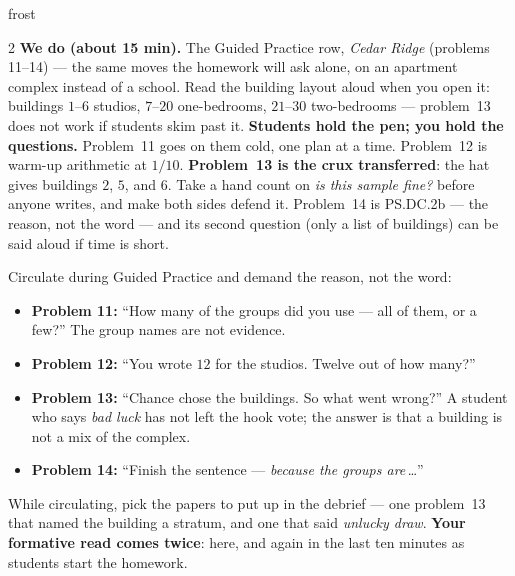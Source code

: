 \documentclass[10pt]{article}
\begin{document}
\begin{skillbox}{frost}
\begin{multicols}{2}
\columnbreak
\textbf{We do (about 15 min).} The Guided Practice row, \emph{Cedar Ridge} (problems 11--14)
--- the same moves the homework will ask alone, on an apartment complex instead of a school.
Read the building layout aloud when you open it: buildings $1$--$6$ studios, $7$--$20$
one-bedrooms, $21$--$30$ two-bedrooms --- problem~13 does not work if students skim past it.
\textbf{Students hold the pen; you hold the questions.} Problem~11 goes on them cold, one plan
at a time. Problem~12 is warm-up arithmetic at $1/10$. \textbf{Problem~13 is the crux
transferred}: the hat gives buildings $2$, $5$, and $6$. Take a hand count on \emph{is this
sample fine?} before anyone writes, and make both sides defend it. Problem~14 is PS.DC.2b ---
the reason, not the word --- and its second question (only a list of buildings) can be said
aloud if time is short.

Circulate during Guided Practice and demand the reason, not the word:
\begin{itemize}[leftmargin=1.1em, nosep]
  \item \textbf{Problem 11:} ``How many of the groups did you use --- all of them, or a few?''
        The group names are not evidence.
  \item \textbf{Problem 12:} ``You wrote $12$ for the studios. Twelve out of how many?''
  \item \textbf{Problem 13:} ``Chance chose the buildings. So what went wrong?'' A student who
        says \emph{bad luck} has not left the hook vote; the answer is that a building is not
        a mix of the complex.
  \item \textbf{Problem 14:} ``Finish the sentence --- \emph{because the groups are}\,\ldots''
\end{itemize}
While circulating, pick the papers to put up in the debrief --- one problem~13 that named the
building a stratum, and one that said \emph{unlucky draw}. \textbf{Your formative read comes
twice}: here, and again in the last ten minutes as students start the homework.
\end{multicols}
\end{skillbox}
\end{document}
